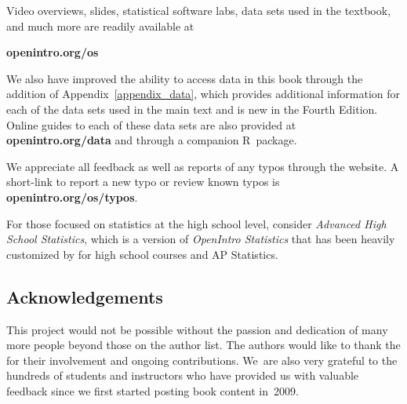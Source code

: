 Video overviews, slides, statistical software labs,
data sets used in the textbook,
and much more are readily available at\\[-5mm]
\begin{center}
    {\color{black}\textbf{openintro.org/os}}
\end{center}
We also have improved the ability to access data in this book
through the addition of Appendix~\ref{appendix_data},
which provides additional information for each of the data sets
used in the main text and is new in the Fourth Edition.
Online guides to each of these data sets are also provided at
    {\color{black}\textbf{openintro.org/data}}
and through a
    {companion R~package}.
\vspace{3mm}

\noindent%
We appreciate all feedback as well as reports of any
typos through the website.
A short-link to report a new typo or review known typos is
    {\color{black}\textbf{openintro.org/os/typos}}. \vspace{3mm}

\noindent%
For those focused on statistics at the high school level,
consider
    {\emph{Advanced High School Statistics}},
which is a version of \emph{OpenIntro Statistics} that has
been heavily customized by 
for high school courses and
AP\textsuperscript{\textregistered} Statistics.


\subsection*{Acknowledgements}
This project would not be possible without the passion and
dedication of many more people beyond those on the author list.
The authors would like to thank the
for their involvement and ongoing contributions.
We~are also very grateful to the hundreds of students
and instructors who have provided us with valuable feedback
since we first started posting book content in~2009. \vspace{3mm}

